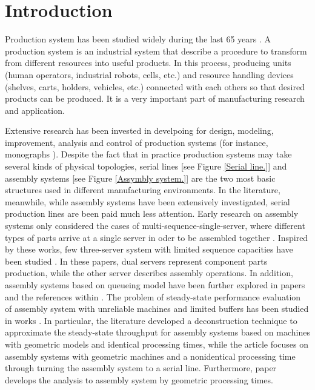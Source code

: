 \chapter{Introduction}
\setlength{\parindent}{2pc}
\label{intro}
\noindent 
Production system has been studied widely during the last 65 years \cite{papadopolous1993queueing}. A production system is an industrial system that describe a procedure to transform from different resources into useful products. In this process, producing units (human operators, industrial robots, cells, etc.) and resource handling devices (shelves, carts, holders, vehicles, etc.) connected with each others so that desired products can be produced. It is a very important part of manufacturing research and application. 

Extensive research has been invested in develpoing for design, modeling, improvement, analysis and control of production systems (for instance, monographs \cite{buzacott1993stochastic, askin1993modeling, bonomi1987approximate, rao2000performance}). Despite the fact that in practice production systems may take several kinds of physical topologies, serial lines [see Figure \ref{Serial line.}] and assembly systems [see Figure \ref{Assymbly system.}] are the two most basic structures used in different manufacturing environments. In the literature, meanwhile, while assembly systems have been extensively investigated, serial production lines are been paid much less attention. Early research on assembly systems only considered the cases of multi-sequence-single-server, where different types of parts arrive at a single server in oder to be assembled together \cite{harrison1973assembly, bonomi1987approximate}. Inspired by these works, few three-server system with limited sequence capacities have been studied \cite{kuo1996improvability,lipper1986assembly}. In these papers, dual servers represent component parts production, while the other server describes assembly operations. In addition, assembly systems based on queueing model have been further explored in papers \cite{manitz2008queueing, rao2000performance, rao1994approximate} and the references within . The problem of steady-state performance evaluation of assembly system with unreliable machines and limited buffers has been studied in works \cite{gershwin1991assembly,liu1990approximate, helber1998decomposition, mascolo1991modeling, chiang2000improvability, chiang1970improvability} . In particular, the literature \cite{gershwin1991assembly} developed a deconstruction technique to approximate the steady-state throughput for assembly systems based on machines with geometric models and identical processing times, while the article \cite{liu1990approximate} focuses on assembly systems with geometric machines and a nonidentical processing time through turning the assembly system to a serial line. Furthermore, paper \cite{helber1998decomposition} develops the analysis to assembly system by geometric processing times.

